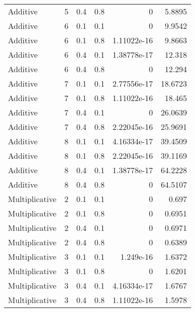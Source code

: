 \documentclass{article}
\begin{document}
\begin{figure}[H]
\begin{tabular}{lrrrrr}
 Additive       &       5 &   0.4 &            0.8 & 0           &            5.8895 \\
 Additive       &       6 &   0.1 &            0.1 & 0           &            9.9542 \\
 Additive       &       6 &   0.1 &            0.8 & 1.11022e-16 &            9.8663 \\
 Additive       &       6 &   0.4 &            0.1 & 1.38778e-17 &           12.318  \\
 Additive       &       6 &   0.4 &            0.8 & 0           &           12.294  \\
 Additive       &       7 &   0.1 &            0.1 & 2.77556e-17 &           18.6723 \\
 Additive       &       7 &   0.1 &            0.8 & 1.11022e-16 &           18.465  \\
 Additive       &       7 &   0.4 &            0.1 & 0           &           26.0639 \\
 Additive       &       7 &   0.4 &            0.8 & 2.22045e-16 &           25.9691 \\
 Additive       &       8 &   0.1 &            0.1 & 4.16334e-17 &           39.4509 \\
 Additive       &       8 &   0.1 &            0.8 & 2.22045e-16 &           39.1169 \\
 Additive       &       8 &   0.4 &            0.1 & 1.38778e-17 &           64.2228 \\
 Additive       &       8 &   0.4 &            0.8 & 0           &           64.5107 \\
 Multiplicative &       2 &   0.1 &            0.1 & 0           &            0.697  \\
 Multiplicative &       2 &   0.1 &            0.8 & 0           &            0.6951 \\
 Multiplicative &       2 &   0.4 &            0.1 & 0           &            0.6971 \\
 Multiplicative &       2 &   0.4 &            0.8 & 0           &            0.6389 \\
 Multiplicative &       3 &   0.1 &            0.1 & 1.249e-16   &            1.6372 \\
 Multiplicative &       3 &   0.1 &            0.8 & 0           &            1.6201 \\
 Multiplicative &       3 &   0.4 &            0.1 & 4.16334e-17 &            1.6767 \\
 Multiplicative &       3 &   0.4 &            0.8 & 1.11022e-16 &            1.5978 \\

\end{tabular}
\end{figure}
\end{document}

